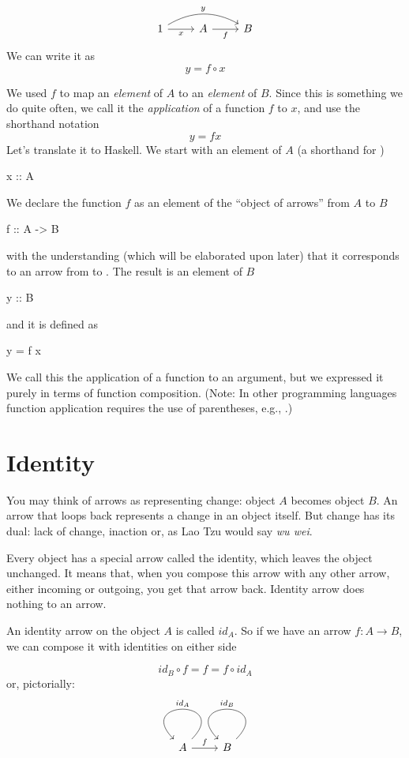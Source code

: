 \documentclass[DaoFP]{subfiles}
\begin{document}
\[
 \begin{tikzcd}
 1
 \arrow[rr, bend left, "y"]
 \arrow[r, "x"']
 & A
 \arrow[r, "f"']
& B
 \end{tikzcd}
\]
We can write it as
\[y = f \circ x \]

We used $f$ to map an \emph{element} of $A$ to an \emph{element} of $B$. Since this is something we do quite often, we call it the \emph{application} of a function $f$ to $x$, and use the shorthand notation
\[y = f x \]
Let's translate it to Haskell. We start with an element of $A$ (a shorthand for )
\begin{haskell}
x :: A
\end{haskell}
We declare the function $f$ as an element of the ``object of arrows'' from $A$ to $B$
\begin{haskell}
f :: A -> B
\end{haskell}
with the understanding (which will be elaborated upon later) that it corresponds to an arrow from  to . The result is an element of $B$
\begin{haskell}
y :: B
\end{haskell}
and it is defined as
\begin{haskell}
y = f x
\end{haskell}
We call this the application of a function to an argument, but we expressed it purely in terms of function composition. (Note: In other programming languages function application requires the use of parentheses, e.g., .)

\section{Identity}

You may think of arrows as representing change: object $A$ becomes object $B$. An arrow that loops back represents a change in an object itself. But change has its dual: lack of change, inaction or, as Lao Tzu would say \emph{wu wei}. 

Every object has a special arrow called the identity, which leaves the object unchanged. It means that, when you compose this arrow with any other arrow, either incoming or outgoing, you get that arrow back. Identity arrow does nothing to an arrow. 

An identity arrow on the object $A$ is called $id_A$. So if we have an arrow $f \colon A \to B$, we can compose it with identities on either side

\[id_B \circ f = f = f \circ id_A \]
or, pictorially:
\[
 \begin{tikzcd}
 A
 \arrow[loop, "id_A"']
 \arrow[r, "f"]
 & B
 \arrow[loop, "id_B"']
 \end{tikzcd}
\]
\end{document}
